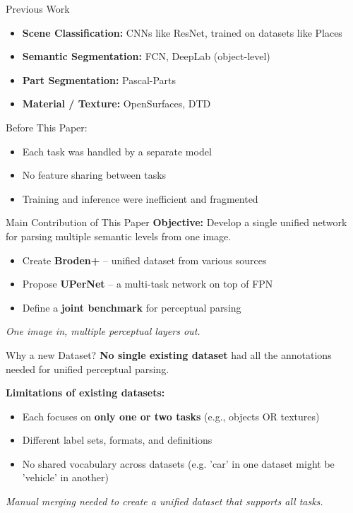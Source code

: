 \documentclass{beamer}
\begin{document}

\begin{frame}{Previous Work}
  \begin{itemize}
    \item \textbf{Scene Classification:} CNNs like ResNet, trained on datasets like Places
    \item \textbf{Semantic Segmentation:} FCN, DeepLab (object-level)
    \item \textbf{Part Segmentation:} Pascal-Parts
    \item \textbf{Material / Texture:} OpenSurfaces, DTD
  \end{itemize}
  
  \begin{block}{Before This Paper:}
    \begin{itemize}
      \item Each task was handled by a separate model
      \item No feature sharing between tasks
      \item Training and inference were inefficient and fragmented
    \end{itemize}
  \end{block}
\end{frame}


\begin{frame}{Main Contribution of This Paper}
  \textbf{Objective:} Develop a single unified network for parsing multiple semantic levels from one image.

  \begin{itemize}
    \item Create \textbf{Broden+} – unified dataset from various sources
    \item Propose \textbf{UPerNet} – a multi-task network on top of FPN
    \item Define a \textbf{joint benchmark} for perceptual parsing
  \end{itemize}

  \vfill
  \textit{One image in, multiple perceptual layers out.}
\end{frame}


\begin{frame}{Why a new Dataset?}
  \textbf{No single existing dataset} had all the annotations needed for unified perceptual parsing.
  \vspace{0.4cm}

  \textbf{Limitations of existing datasets:}
  \begin{itemize}
    \item Each focuses on \textbf{only one or two tasks} (e.g., objects OR textures)
    \item Different label sets, formats, and definitions
    \item No shared vocabulary across datasets (e.g. 'car' in one dataset might be 'vehicle' in another)
  \end{itemize}
  \vfill
  \textit{Manual merging needed to create a unified dataset that supports all tasks.}
\end{frame}
\end{document}
